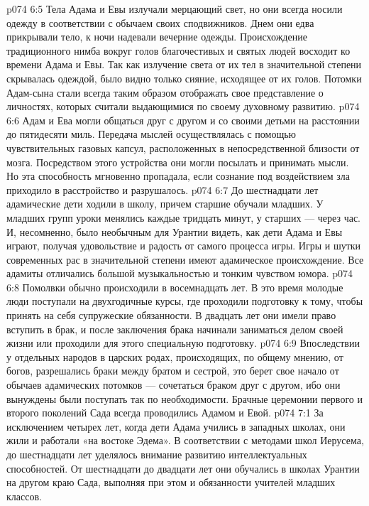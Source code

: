 \vs p074 6:5 \pc Тела Адама и Евы излучали мерцающий свет, но они всегда носили одежду в соответствии с обычаем своих сподвижников. Днем они едва прикрывали тело, к ночи надевали вечерние одежды. Происхождение традиционного нимба вокруг голов благочестивых и святых людей восходит ко времени Адама и Евы. Так как излучение света от их тел в значительной степени скрывалась одеждой, было видно только сияние, исходящее от их голов. Потомки Адам\hyp{}сына стали всегда таким образом отображать свое представление о личностях, которых считали выдающимися по своему духовному развитию.
\vs p074 6:6 Адам и Ева могли общаться друг с другом и со своими детьми на расстоянии до пятидесяти миль. Передача мыслей осуществлялась с помощью чувствительных газовых капсул, расположенных в непосредственной близости от мозга. Посредством этого устройства они могли посылать и принимать мысли. Но эта способность мгновенно пропадала, если сознание под воздействием зла приходило в расстройство и разрушалось.
\vs p074 6:7 \pc До шестнадцати лет адамические дети ходили в школу, причем старшие обучали младших. У младших групп уроки менялись каждые тридцать минут, у старших --- через час. И, несомненно, было необычным для Урантии видеть, как дети Адама и Евы играют, получая удовольствие и радость от самого процесса игры. Игры и шутки современных рас в значительной степени имеют адамическое происхождение. Все адамиты отличались большой музыкальностью и тонким чувством юмора.
\vs p074 6:8 Помолвки обычно происходили в восемнадцать лет. В это время молодые люди поступали на двухгодичные курсы, где проходили подготовку к тому, чтобы принять на себя супружеские обязанности. В двадцать лет они имели право вступить в брак, и после заключения брака начинали заниматься делом своей жизни или проходили для этого специальную подготовку.
\vs p074 6:9 Впоследствии у отдельных народов в царских родах, происходящих, по общему мнению, от богов, разрешались браки между братом и сестрой, это берет свое начало от обычаев адамических потомков --- сочетаться браком друг с другом, ибо они вынуждены были поступать так по необходимости. Брачные церемонии первого и второго поколений Сада всегда проводились Адамом и Евой.
\vs p074 7:1 За исключением четырех лет, когда дети Адама учились в западных школах, они жили и работали «на востоке Эдема». В соответствии с методами школ Иерусема, до шестнадцати лет уделялось внимание развитию интеллектуальных способностей. От шестнадцати до двадцати лет они обучались в школах Урантии на другом краю Сада, выполняя при этом и обязанности учителей младших классов.
